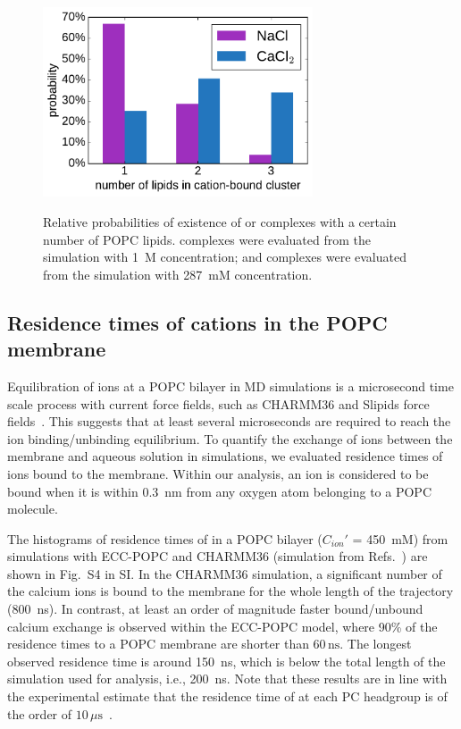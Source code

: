 \begin{figure}[tb!] 
  \centering 
  \includegraphics[width=8.0cm]{../img/ecc_popc/stoichiometry_NaCl-CaCl2_comparison_Ecc-lipids.pdf} \\ 
  \caption{\label{fig:cacl_complexes} 
      Relative probabilities of existence of  or  complexes 
      with a certain number of POPC lipids.  
       complexes were evaluated from the simulation with 1~M concentration; 
      and  complexes were evaluated from the simulation with 287~mM concentration. 
  } 
\end{figure} 
 
 
 
 
\subsection{Residence times of  cations in the POPC membrane} 
 
Equilibration of  ions at a POPC bilayer in MD simulations is a microsecond time scale process with current force fields, such  as CHARMM36 and Slipids force fields~\citep{javanainen17}. This suggests that at least several microseconds are required to reach the ion binding/unbinding equilibrium. 
To quantify the exchange of ions between the membrane and aqueous solution in simulations, we evaluated residence times of ions bound to the membrane. Within our analysis, an ion is considered to be bound when it is within 0.3~nm from any oxygen atom belonging to a POPC molecule. 
 
The histograms of residence times of  in a POPC bilayer ($C_{ion}'$ = 450~mM) from simulations with  
ECC-POPC and CHARMM36 (simulation from Refs.~\citep{javanainen17,zenodo.259376}) are shown in Fig.~S4 in SI. 
In the CHARMM36 simulation, a significant number of the calcium ions is bound to the membrane for the whole length of the trajectory (800~ns). 
In contrast, at least an order of magnitude faster bound/unbound calcium exchange is observed within the ECC-POPC model, 
where 90\% of the  residence times to a POPC membrane are shorter than $60\,\mathrm{ns}$. The longest observed 
residence time is around 150~ns, which is below the total length of the simulation used for analysis, i.e., 200~ns. 
Note that these results are in line with the experimental estimate that the residence time of  at each PC 
headgroup is of the order of $10\,\mu\mathrm{s}$~\citep{altenbach84}. 
 
